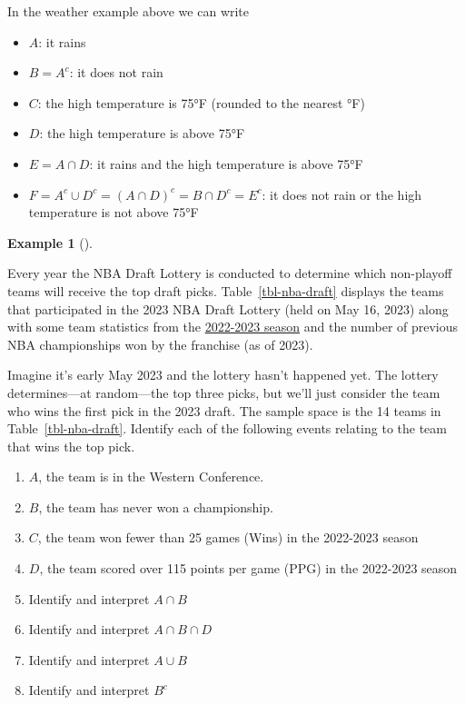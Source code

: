\documentclass[
  letterpaper,
  DIV=11,
  numbers=noendperiod]{scrreprt}
\providecommand{\tightlist}{%
  \setlength{\itemsep}{0pt}\setlength{\parskip}{0pt}}
\theoremstyle{plain}
\theoremstyle{definition}
\newtheorem{example}{Example}[chapter]
\theoremstyle{definition}
\theoremstyle{definition}
\theoremstyle{remark}
\begin{document}
In the weather example above we can write

\begin{itemize}
\tightlist
\item
  \(A\): it rains
\item
  \(B=A^c\): it does not rain
\item
  \(C\): the high temperature is 75°F (rounded to the nearest °F)
\item
  \(D\): the high temperature is above 75°F
\item
  \(E = A \cap D\): it rains and the high temperature is above 75°F
\item
  \(F = A^c \cup D^c = (A\cap D)^c = B\cap D^c = E^c\): it does not rain
  or the high temperature is not above 75°F
\end{itemize}

\begin{tcolorbox}[enhanced jigsaw, opacityback=0, left=2mm, colframe=quarto-callout-note-color-frame, toprule=.15mm, breakable, colback=white, leftrule=.75mm, arc=.35mm, rightrule=.15mm, bottomrule=.15mm]

\begin{example}[]\protect\hypertarget{exm-simple-event}{}\label{exm-simple-event}

Every year the NBA Draft Lottery is conducted to determine which
non-playoff teams will receive the top draft picks.
Table~\ref{tbl-nba-draft} displays the teams that participated in the
2023 NBA Draft Lottery (held on May 16, 2023) along with some team
statistics from the
\href{https://www.basketball-reference.com/leagues/NBA_2023.html}{2022-2023
season} and the number of previous NBA championships won by the
franchise (as of 2023).

Imagine it's early May 2023 and the lottery hasn't happened yet. The
lottery determines---at random---the top three picks, but we'll just
consider the team who wins the first pick in the 2023 draft. The sample
space is the 14 teams in Table~\ref{tbl-nba-draft}. Identify each of the
following events relating to the team that wins the top pick.

\begin{enumerate}
\def\labelenumi{\arabic{enumi}.}
\tightlist
\item
  \(A\), the team is in the Western Conference.
\item
  \(B\), the team has never won a championship.
\item
  \(C\), the team won fewer than 25 games (Wins) in the 2022-2023 season
\item
  \(D\), the team scored over 115 points per game (PPG) in the 2022-2023
  season
\item
  Identify and interpret \(A\cap B\)
\item
  Identify and interpret \(A \cap B \cap D\)
\item
  Identify and interpret \(A \cup B\)
\item
  Identify and interpret \(B^c\)
\end{enumerate}

\end{example}

\end{tcolorbox}
\end{document}
